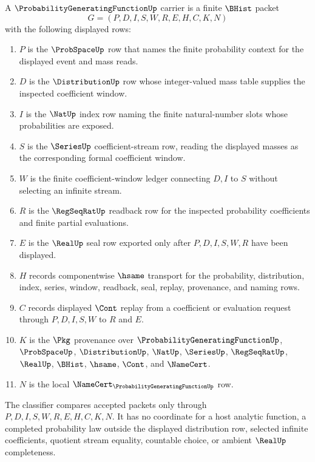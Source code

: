\begin{definition}
\label{def:probability-generating-function-carrier}
A $\ProbabilityGeneratingFunctionUp$ carrier is a finite $\BHist$ packet
$$
G=(P,D,I,S,W,R,E,H,C,K,N)
$$
with the following displayed rows:
\begin{enumerate}
\item $P$ is the $\ProbSpaceUp$ row that names the finite probability context for the displayed event and mass reads.
\item $D$ is the $\DistributionUp$ row whose integer-valued mass table supplies the inspected coefficient window.
\item $I$ is the $\NatUp$ index row naming the finite natural-number slots whose probabilities are exposed.
\item $S$ is the $\SeriesUp$ coefficient-stream row, reading the displayed masses as the corresponding formal coefficient window.
\item $W$ is the finite coefficient-window ledger connecting $D,I$ to $S$ without selecting an infinite stream.
\item $R$ is the $\RegSeqRatUp$ readback row for the inspected probability coefficients and finite partial evaluations.
\item $E$ is the $\RealUp$ seal row exported only after $P,D,I,S,W,R$ have been displayed.
\item $H$ records componentwise $\hsame$ transport for the probability, distribution, index, series, window, readback, seal, replay, provenance, and naming rows.
\item $C$ records displayed $\Cont$ replay from a coefficient or evaluation request through $P,D,I,S,W$ to $R$ and $E$.
\item $K$ is the $\Pkg$ provenance over $\ProbabilityGeneratingFunctionUp$, $\ProbSpaceUp$, $\DistributionUp$, $\NatUp$, $\SeriesUp$, $\RegSeqRatUp$, $\RealUp$, $\BHist$, $\hsame$, $\Cont$, and $\NameCert$.
\item $N$ is the local $\NameCert_{\ProbabilityGeneratingFunctionUp}$ row.
\end{enumerate}
The classifier compares accepted packets only through $P,D,I,S,W,R,E,H,C,K,N$. It has no coordinate for a host analytic function, a completed probability law outside the displayed distribution row, selected infinite coefficients, quotient stream equality, countable choice, or ambient $\RealUp$ completeness.
\end{definition}

